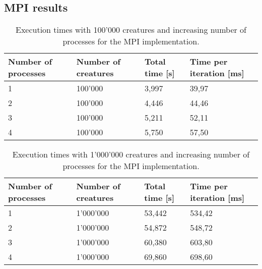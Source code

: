 \documentclass[12pt,a4paper,oneside]{article}
\begin{document}
	\subsection{MPI results}
	\begin{table}[!ht]
		\begin{tabular}{|l|l|l|l|}
		\hline
		Number of processes & Number of creatures & Total time {[}s{]} & Time per iteration {[}ms{]} \\ \hline
		1                   & 100'000             & 3,997              & 39,97                       \\ \hline
		2                   & 100'000             & 4,446              & 44,46                       \\ \hline
		3                   & 100'000             & 5,211              & 52,11                       \\ \hline
		4                   & 100'000             & 5,750              & 57,50                       \\ \hline
		\end{tabular}
		\caption{Execution times with 100'000 creatures and increasing number of processes for the MPI implementation.}
	\end{table}

	\begin{table}[!ht]
		\begin{tabular}{|l|l|l|l|}
		\hline
		Number of processes & Number of creatures & Total time {[}s{]} & Time per iteration {[}ms{]} \\ \hline
		1                   & 1'000'000           & 53,442             & 534,42                      \\ \hline
		2                   & 1'000'000           & 54,872             & 548,72                      \\ \hline
		3                   & 1'000'000           & 60,380             & 603,80                      \\ \hline
		4                   & 1'000'000           & 69,860             & 698,60                      \\ \hline
		\end{tabular}
		\caption{Execution times with 1'000'000 creatures and increasing number of processes for the MPI implementation.}
	\end{table}
\end{document}
